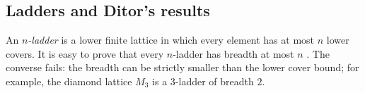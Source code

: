 \documentclass[]{amsart}
\theoremstyle{definition}
\theoremstyle{remark}
\begin{document}
%
%
%


\subsection{Ladders and Ditor's results}

An \emph{$n$-ladder} is a lower finite lattice in which every element has at most $n$ lower covers. It is easy to prove that every $n$-ladder has breadth at most $n$ \cite[Proposition 4.1]{MR0732199}. The converse fails: the breadth can be strictly smaller than the lower cover bound; for example, the diamond lattice $M_3$ is a $3$-ladder of breadth $2$.  
\end{document}
